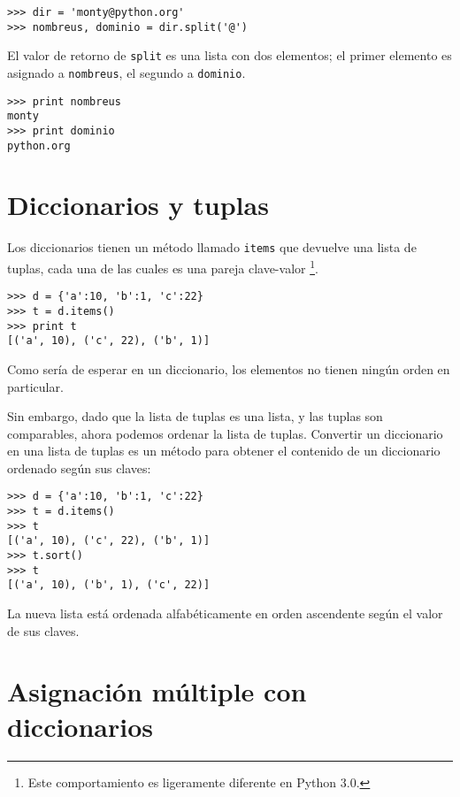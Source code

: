 
\beforeverb
\begin{verbatim}
>>> dir = 'monty@python.org'
>>> nombreus, dominio = dir.split('@')
\end{verbatim}
\afterverb
%
El valor de retorno de {\tt split} es una lista con dos elementos;
el primer elemento es asignado a {\tt nombreus}, el segundo a
{\tt dominio}.

\beforeverb
\begin{verbatim}
>>> print nombreus
monty
>>> print dominio
python.org
\end{verbatim}
\afterverb
%

\section{Diccionarios y tuplas}


Los diccionarios tienen un método llamado {\tt items} que devuelve una lista de
tuplas, cada una de las cuales es una pareja clave-valor
\footnote{Este comportamiento es ligeramente diferente en Python 3.0.}.

\beforeverb
\begin{verbatim}
>>> d = {'a':10, 'b':1, 'c':22}
>>> t = d.items()
>>> print t
[('a', 10), ('c', 22), ('b', 1)]
\end{verbatim}
\afterverb
%
Como sería de esperar en un diccionario, los elementos no
tienen ningún orden en particular.

Sin embargo, dado que la lista de tuplas es una lista, y las tuplas
son comparables, ahora podemos ordenar la lista de tuplas. Convertir un diccionario
en una lista de tuplas es un método para obtener el contenido de un
diccionario ordenado según sus claves:

\beforeverb
\begin{verbatim}
>>> d = {'a':10, 'b':1, 'c':22}
>>> t = d.items()
>>> t
[('a', 10), ('c', 22), ('b', 1)]
>>> t.sort()
>>> t
[('a', 10), ('b', 1), ('c', 22)]
\end{verbatim}
\afterverb
%
La nueva lista está ordenada alfabéticamente en orden ascendente según el valor de sus claves.

\section{Asignación múltiple con diccionarios}

